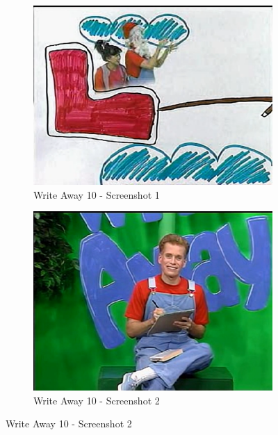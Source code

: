\begin{figure}[H]
    \centering
    \begin{subfigure}{0.45\textwidth}
        \centering
        \includegraphics[width=\linewidth]{Games/WriteAway/Images/WriteAway10Screenshot1.png}
        \caption{Write Away 10 - Screenshot 1}
        \label{fig:sub1}
    \end{subfigure}
    \begin{subfigure}{0.45\textwidth}
        \centering
        \includegraphics[width=\linewidth]{Games/WriteAway/Images/WriteAway10Screenshot2.png}
        \caption{Write Away 10 - Screenshot 2}
        \label{fig:sub2}
    \end{subfigure}


\end{figure}

